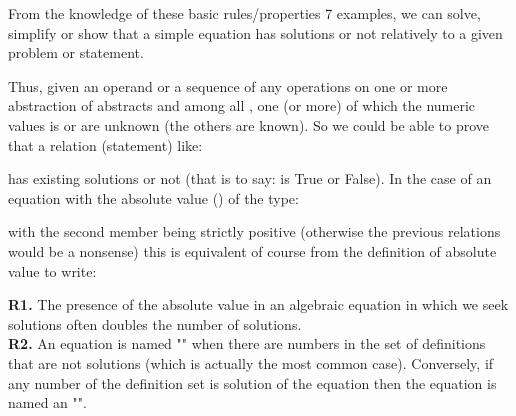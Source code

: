 	From the knowledge of these basic rules/properties 7 examples, we can solve, simplify or show that a simple equation has solutions or not relatively to a given  problem or statement.

	Thus, given an operand or a sequence of any operations on one or more abstraction of abstracts and among all , one (or more) of which the numeric values is or are unknown (the others are known). So we could be able to prove that a relation (statement) like:
	
	has existing solutions or not (that is to say: is True or False).
In the case of an equation with the absolute value () of the type:
	
	with the second member being strictly positive (otherwise the previous relations would be a nonsense) this is equivalent  of course from the definition of absolute value to write:
	

	\begin{tcolorbox}[title=Remark,colframe=black,arc=10pt]
	\textbf{R1.} The presence of the absolute value in an algebraic equation in which we seek solutions often doubles the number of solutions.\\
	
	\textbf{R2.} An equation is named "" when there are numbers in the set of definitions that are not solutions (which is actually the most common case). Conversely, if any number of the definition set is solution of the equation then the equation is named an "".
	\end{tcolorbox}	
	
